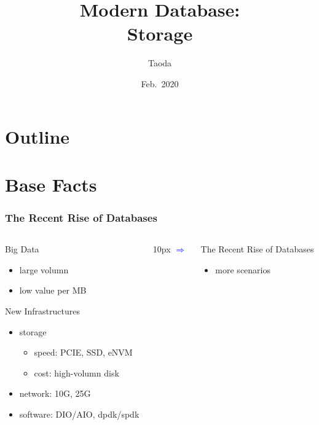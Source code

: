 \documentclass[lualatex]{beamer}
\title[Modern DB: Storage]{Modern Database:\\\normalsize Storage}
\author{Taoda}
\institute{YITU tech}
\date{Feb.\ 2020}
\begin{document}
\begin{frame}
\titlepage
\end{frame}

\section*{Outline}
\frame{\tableofcontents}

\section{Base Facts}

\begin{frame}
  \frametitle{The Recent Rise of Databases}
  \begin{columns}
    \begin{column}{0.4\textwidth}
      \begin{block}{Big Data}
        \begin{itemize}
          \item large volumn
          \item low value per MB
        \end{itemize}
      \end{block}
      \begin{block}{New Infrastructures}
        \begin{itemize}
          \item storage
            \begin{itemize}
              \item speed: PCIE, SSD, eNVM
              \item cost: high-volumn disk
            \end{itemize}
          \item network: 10G, 25G
          \item software: DIO/AIO, dpdk/spdk
        \end{itemize}
      \end{block}
    \end{column}
    \begin{column}{10px}
      \Large \textcolor{blue}{$\Rightarrow$}
    \end{column}
    \begin{column}{0.45\textwidth}
      \begin{exampleblock}{The Recent Rise of Databases}
        \begin{itemize}
          \item more scenarios
            \begin{itemize}

\end{itemize}
\end{itemize}
\end{exampleblock}
\end{column}
\end{columns}
\end{frame}
\end{document}
